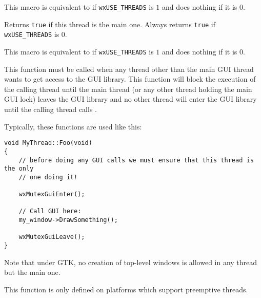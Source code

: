 \label{wxentercritsect}


This macro is equivalent to  if 
{\tt wxUSE\_THREADS} is $1$ and does nothing if it is $0$.



\label{wxismainthread}


Returns {\tt true} if this thread is the main one. Always returns {\tt true} if
{\tt wxUSE\_THREADS} is $0$.



\label{wxleavecritsect}


This macro is equivalent to  if 
{\tt wxUSE\_THREADS} is $1$ and does nothing if it is $0$.



\label{wxmutexguienter}


This function must be called when any thread other than the main GUI thread
wants to get access to the GUI library. This function will block the execution
of the calling thread until the main thread (or any other thread holding the
main GUI lock) leaves the GUI library and no other thread will enter the GUI
library until the calling thread calls .

Typically, these functions are used like this:

\begin{verbatim}
void MyThread::Foo(void)
{
    // before doing any GUI calls we must ensure that this thread is the only
    // one doing it!

    wxMutexGuiEnter();

    // Call GUI here:
    my_window->DrawSomething();

    wxMutexGuiLeave();
}
\end{verbatim}

Note that under GTK, no creation of top-level windows is allowed in any
thread but the main one.

This function is only defined on platforms which support preemptive
threads.



